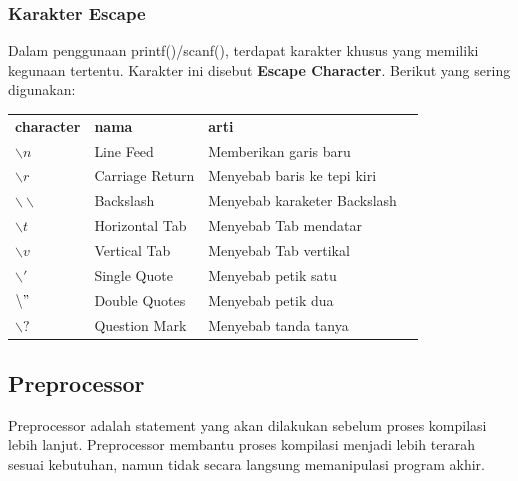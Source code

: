 \documentclass[12pt,]{article}
\begin{document}
	\subsubsection{Karakter Escape}
	Dalam penggunaan printf()/scanf(), terdapat karakter khusus yang memiliki kegunaan tertentu.
	Karakter ini disebut \textbf{Escape Character}.
	Berikut yang sering digunakan:
	\begin{table}[H]
		\begin{tabular}{|l|l|l|l}
			\cline{1-3}
			\textbf{character} & \textbf{nama} & \textbf{arti} \\ \cline{1-3}
			$\backslash n$          & Line Feed	   & Memberikan garis baru        \\ \cline{1-3}
			$\backslash r$          & Carriage Return & Menyebab baris ke tepi kiri  \\ \cline{1-3}
			$\backslash \backslash$ & Backslash       & Menyebab karaketer Backslash \\ \cline{1-3}
		    $\backslash t$          & Horizontal Tab  & Menyebab Tab mendatar        \\ \cline{1-3}
			$\backslash v$          & Vertical Tab    & Menyebab Tab vertikal        \\ \cline{1-3}
			$\backslash '$          & Single Quote    & Menyebab petik satu          \\ \cline{1-3}
			$\backslash "$          & Double Quotes   & Menyebab petik dua           \\ \cline{1-3}
			$\backslash ?$          & Question Mark   & Menyebab tanda tanya         \\ \cline{1-3}
		\end{tabular}
	\end{table}
	
	\newpage
	\subsection{Preprocessor}
	
	Preprocessor adalah statement yang akan dilakukan sebelum proses kompilasi lebih lanjut.
	Preprocessor membantu proses kompilasi menjadi lebih terarah sesuai kebutuhan, namun tidak secara langsung memanipulasi program akhir.
	
\end{document}
